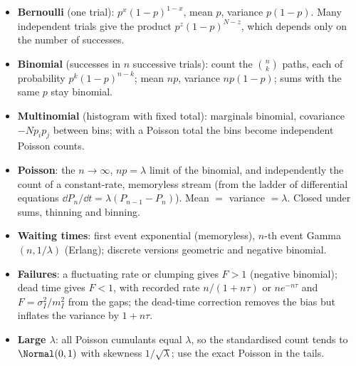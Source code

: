 \begin{recap}
\begin{itemize}
  \item \textbf{Bernoulli} (one trial): $p^x(1-p)^{1-x}$, mean $p$, variance $p(1-p)$. Many independent trials give the product $p^z(1-p)^{N-z}$, which depends only on the number of successes.
  \item \textbf{Binomial} (successes in $n$ successive trials): count the $\binom nk$ paths, each of probability $p^k(1-p)^{n-k}$; mean $np$, variance $np(1-p)$; sums with the same $p$ stay binomial.
  \item \textbf{Multinomial} (histogram with fixed total): marginals binomial, covariance $-Np_ip_j$ between bins; with a Poisson total the bins become independent Poisson counts.
  \item \textbf{Poisson}: the $n\to\infty$, $np=\lambda$ limit of the binomial, and independently the count of a constant-rate, memoryless stream (from the ladder of differential equations $\dd P_n/\dd t=\lambda(P_{n-1}-P_n)$). Mean $=$ variance $=\lambda$. Closed under sums, thinning and binning.
  \item \textbf{Waiting times}: first event exponential (memoryless), $n$-th event Gamma$(n,1/\lambda)$ (Erlang); discrete versions geometric and negative binomial.
  \item \textbf{Failures}: a fluctuating rate or clumping gives $F>1$ (negative binomial); dead time gives $F<1$, with recorded rate $n/(1+n\tau)$ or $ne^{-n\tau}$ and $F=\sigma_I^2/m_I^2$ from the gaps; the dead-time correction removes the bias but inflates the variance by $1+n\tau$.
  \item \textbf{Large $\lambda$}: all Poisson cumulants equal $\lambda$, so the standardised count tends to $\Normal(0,1)$ with skewness $1/\sqrt\lambda$; use the exact Poisson in the tails.
\end{itemize}
\end{recap}
\providecommand{\tbStirTen}{}\renewcommand{\tbStirTen}{1.00837}
\providecommand{\tbStirOne}{}\renewcommand{\tbStirOne}{1.0844}
\providecommand{\tbDMLslope}{}\renewcommand{\tbDMLslope}{-1.00}
\providecommand{\tbDMLerrTen}{}\renewcommand{\tbDMLerrTen}{0.0168}
\providecommand{\tbDMLerrMax}{}\renewcommand{\tbDMLerrMax}{1.8\times10^{-5}}
\providecommand{\tbDMLnMax}{}\renewcommand{\tbDMLnMax}{10000}
\providecommand{\tbCBexact}{}\renewcommand{\tbCBexact}{0.268}
\providecommand{\tbCBplain}{}\renewcommand{\tbCBplain}{0.207}
\providecommand{\tbCBcc}{}\renewcommand{\tbCBcc}{0.270}
